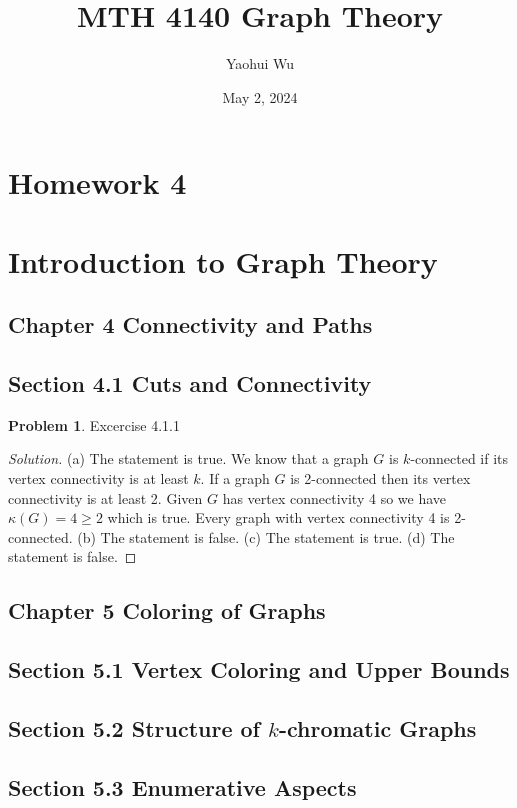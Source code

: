 \documentclass[12pt]{article}
\title{MTH 4140 Graph Theory}
\author{Yaohui Wu}
\date{May 2, 2024}
\theoremstyle{definition}
\newtheorem{problem}{Problem}
\newenvironment*{solution}{\begin{proof}[Solution]}{\end{proof}}
\begin{document}
\maketitle
\section*{Homework 4}
\section*{Introduction to Graph Theory}

\subsection*{Chapter 4 Connectivity and Paths}
\subsection*{Section 4.1 Cuts and Connectivity}
\begin{problem}
    Excercise 4.1.1
\end{problem}
\begin{solution}
    (a) The statement is true. We know that a graph \(G\) is \(k\)-connected
    if its vertex connectivity is at least \(k\). If a graph \(G\) is
    2-connected then its vertex connectivity is at least 2. Given \(G\) has
    vertex connectivity 4 so we have \(\kappa(G)=4\geq2\) which is true. Every
    graph with vertex connectivity 4 is 2-connected.
    (b) The statement is false.
    (c) The statement is true.
    (d) The statement is false.
\end{solution}

\subsection*{Chapter 5 Coloring of Graphs}
\subsection*{Section 5.1 Vertex Coloring and Upper Bounds}
\subsection*{Section 5.2 Structure of \(k\)-chromatic Graphs}
\subsection*{Section 5.3 Enumerative Aspects}
\end{document}
